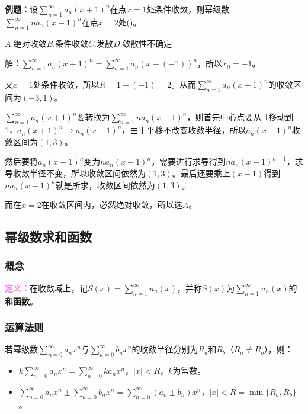 \documentclass[UTF8, 12pt]{ctexart}
\begin{document}
\textbf{例题：}设$\sum\limits_{n=1}^\infty a_n(x+1)^n$在点$x=1$处条件收敛，则幂级数$\sum\limits_{n=1}^\infty na_n(x-1)^n$在点$x=2$处()。

$A.$绝对收敛\qquad$B.$条件收敛\qquad$C.$发散\qquad$D.$敛散性不确定

解：$\sum\limits_{n=1}^\infty a_n(x+1)^n=\sum\limits_{n=1}^\infty a_n(x-(-1))^n$，所以$x_0=-1$。

又$x=1$处条件收敛，所以$R=1-(-1)=2$。从而$\sum\limits_{n=1}^\infty a_n(x+1)^n$的收敛区间为$(-3,1)$。

$\sum\limits_{n=1}^\infty a_n(x+1)^n$要转换为$\sum\limits_{n=1}^\infty na_n(x-1)^n$，则首先中心点要从-1移动到1，$a_n(x+1)^n\to a_n(x-1)^n$，由于平移不改变收敛半径，所以$a_n(x-1)^n$收敛区间为$(1,3)$。

然后要将$a_n(x-1)^n$变为$na_n(x-1)^n$，需要进行求导得到$na_n(x-1)^{n-1}$，求导收敛半径不变，所以收敛区间依然为$(1,3)$。最后还要乘上$(x-1)$得到$na_n(x-1)^n$就是所求，收敛区间依然为$(1,3)$。

而在$x=2$在收敛区间内，必然绝对收敛，所以选$A$。

\subsection{幂级数求和函数}

\subsubsection{概念}

\textcolor{violet}{\textbf{定义：}}在收敛域上，记$S(x)=\sum\limits_{n=1}^\infty u_n(x)$，并称$S(x)$为$\sum\limits_{n=1}^\infty u_n(x)$的\textbf{和函数}。

\subsubsection{运算法则}

若幂级数$\sum\limits_{n=0}^\infty a_nx^n$与$\sum\limits_{n=0}^\infty b_nx^n$的收敛半径分别为$R_a$和$R_b$（$R_a\neq R_b$），则：

\begin{itemize}
    \item $k\sum\limits_{n=0}^\infty a_nx^n=\sum\limits_{n=0}^\infty ka_nx^n$，$\vert x\vert<R$，$k$为常数。
    \item $\sum\limits_{n=0}^\infty a_nx^n\pm\sum\limits_{n=0}^\infty b_nx^n=\sum\limits_{n=0}^\infty (a_n\pm b_n)x^n$，$\vert x\vert<R=\min\{R_a,R_b\}$。
\end{itemize}
\end{document}
